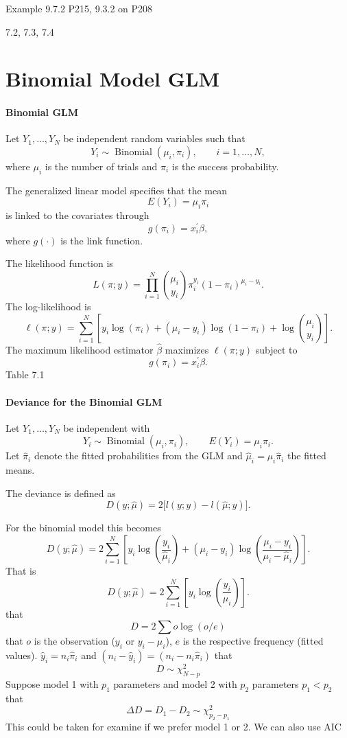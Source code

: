 \documentclass[11pt]{article}
\theoremstyle{definition}
\begin{document}
Example 9.7.2 P215, 9.3.2 on P208

7.2, 7.3, 7.4
\newpage

\section{Binomial Model GLM}
\paragraph{Binomial GLM}
Let $Y_1,\dots,Y_N$ be independent random variables such that
\[
Y_i \sim \operatorname{Binomial}(\mu_i,\pi_i), \qquad i=1,\dots,N,
\]
where $\mu_i$ is the number of trials and $\pi_i$ is the success probability.

The generalized linear model specifies that the mean
\[
E(Y_i)=\mu_i\pi_i
\]
is linked to the covariates through
\[
g(\pi_i)=x_i^{\prime}\beta,
\]
where $g(\cdot)$ is the link function.

The likelihood function is
\[
L(\pi;y)
=
\prod_{i=1}^{N}
\binom{\mu_i}{y_i}
\pi_i^{y_i}(1-\pi_i)^{\mu_i-y_i}.
\]
The log-likelihood is
\[
\ell(\pi;y)
=
\sum_{i=1}^{N}
\left[
y_i\log(\pi_i)
+
(\mu_i-y_i)\log(1-\pi_i)
+
\log\binom{\mu_i}{y_i}
\right].
\]
The maximum likelihood estimator $\hat{\beta}$ maximizes $\ell(\pi;y)$ subject to
\[
g(\pi_i)=x_i^{\prime}\beta.
\]
Table 7.1
\paragraph{Deviance for the Binomial GLM}
Let $Y_1,\dots,Y_N$ be independent with
\[
Y_i \sim \operatorname{Binomial}(\mu_i,\pi_i),
\qquad
E(Y_i)=\mu_i\pi_i .
\]
Let $\hat{\pi}_i$ denote the fitted probabilities from the GLM and
$\hat{\mu}_i=\mu_i\hat{\pi}_i$ the fitted means.

The deviance is defined as
\[
D(y;\hat{\mu})
=
2\bigl[l(y;y)-l(\hat{\mu};y)\bigr].
\]

For the binomial model this becomes
\[
D(y;\hat{\mu})
=
2\sum_{i=1}^{N}
\left[
y_i\log\!\left(\frac{y_i}{\hat{\mu}_i}\right)
+
(\mu_i-y_i)\log\!\left(
\frac{\mu_i-y_i}{\mu_i-\hat{\mu}_i}
\right)
\right].
\]
That is
\[
D(y;\hat{\mu})
=
2\sum_{i=1}^{N}
\left[
y_i\log\!\left(\frac{y_i}{\hat{\mu}_i}\right)
\right].
\]
that
\[
D = 2\sum o\log(o/e)
\]
that $o$ is the observation ($y_i$ or $y_i -\mu_i$), $e$ is the respective frequency (fitted values). $\widehat{y}_i=n_i \widehat{\pi}_i$ and $\left(n_i-\widehat{y}_i\right)=\left(n_i-n_i \widehat{\pi}_i\right)$
that
$$
D\sim\chi^2_{N-p}
$$
Suppose model 1 with $p_1$ parameters and model 2 with $p_2$ parameters $p_1 < p_2$ that
\[
\Delta D = D_1 - D_2 \sim \chi^2_{p_2-p_1}
\]
This could be taken for examine if we prefer model 1 or 2. We can also use AIC
\end{document}
